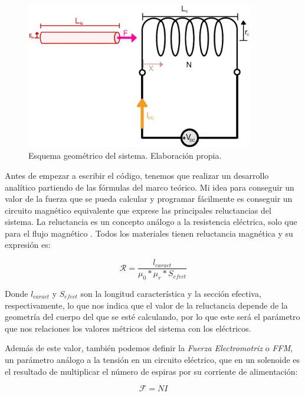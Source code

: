 \begin{figure}[H]
    \centering
    \includegraphics[width=10cm]{FigurasMemoria/esquemaDesTeor.jpg}
    \caption{Esquema geométrico del sistema. Elaboración propia.}
    \label{fig:esquemaDesTeor} %
\end{figure}

Antes de empezar a escribir el código, tenemos que realizar un desarrollo analítico partiendo de las fórmulas del marco teórico. Mi idea para conseguir un valor de la fuerza que se pueda calcular y programar fácilmente es conseguir un circuito magnético equivalente que exprese las principales reluctancias del sistema. La reluctancia es un concepto análogo a la resistencia eléctrica, solo que para el flujo magnético \citep{hughes2005electrical}. Todos los materiales tienen reluctancia magnética y su expresión es:

\begin{center}
    \[\mathcal{R} = \frac{l_{caract}}{\mu_0*\mu_r*S_{efect}}\]
\end{center}

Donde \(l_{caract}\) y \(S_{efect}\) son la longitud característica y la sección efectiva, respectivamente, lo que nos indica que el valor de la reluctancia depende de la geometría del cuerpo del que se esté calculando, por lo que este será el parámetro que nos relaciones los valores métricos del sistema con los eléctricos.

Además de este valor, también podemos definir la \textit{Fuerza Electromotriz} o \textit{FFM}, un parámetro análogo a la tensión en un circuito eléctrico, que en un solenoide es el resultado de multiplicar el número de espiras por su corriente de alimentación:

\begin{center}
    \[\mathcal{F}=NI\]
\end{center}

